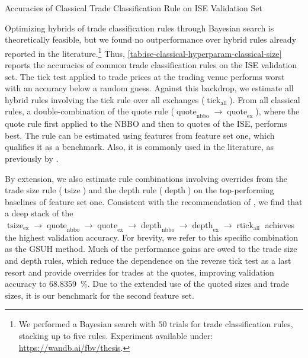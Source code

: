 \begin{table}[H]
    \centering
    \caption[Accuracies of Classical Trade Classification Rule on  Validation Set]{Accuracies of Classical Trade Classification Rule on \gls{ISE} Validation Set}
    \label{tab:ise-classical-hyperparam-classical-size}
    
\end{table}

Optimizing hybrids of trade classification rules through Bayesian search is theoretically feasible, but we found no outperformance over hybrid rules already reported in the literature.\footnote{We performed a Bayesian search with $50$ trials for trade classification rules, stacking up to five rules. Experiment available under: \url{https://wandb.ai/fbv/thesis}.} Thus, \cref{tab:ise-classical-hyperparam-classical-size} reports the accuracies of common trade classification rules on the \gls{ISE} validation set. The tick test applied to trade prices at the trading venue performs worst with an accuracy below a random guess. Against this backdrop, we estimate all hybrid rules involving the tick rule over all exchanges ($\operatorname{tick}_{\mathrm{all}}$). From all classical rules, a double-combination of the quote rule ($\operatorname{quote}_{\mathrm{nbbo}} \to \operatorname{quote}_{\mathrm{ex}}$), where the quote rule first applied to the \gls{NBBO} and then to quotes of the \gls{ISE}, performs best. The rule can be estimated using features from feature set one, which qualifies it as a benchmark. Also, it is commonly used in the literature, as previously by \textcite[][]{muravyevOptionsTradingCosts2020}.

By extension, we also estimate rule combinations involving overrides from the trade size rule ($\operatorname{tsize}$) and the depth rule ($\operatorname{depth}$) on the top-performing baselines of feature set one. Consistent with the recommendation of \textcite[][14]{grauerOptionTradeClassification2022}, we find that a deep stack of the $\operatorname{tsize}_{\mathrm{ex}} \to \operatorname{quote}_{\mathrm{nbbo}} \to \operatorname{quote}_{\mathrm{ex}} \to \operatorname{depth}_{\mathrm{nbbo}} \to \operatorname{depth}_{\mathrm{ex}} \to \operatorname{rtick}_{\mathrm{all}}$ achieves the highest validation accuracy. For brevity, we refer to this specific combination as the \gls{GSUH} method. Much of the performance gains are owed to the trade size and depth rules, which reduce the dependence on the reverse tick test as a last resort and provide overrides for trades at the quotes, improving validation accuracy to \SI{68.8359}{\percent}. Due to the extended use of the quoted sizes and trade sizes, it is our benchmark for the second feature set.

